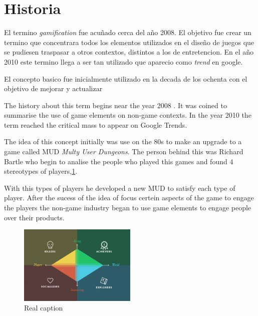 \section{Historia}

El termino \emph{gamification} fue acuñado cerca del año 2008\cite{DefineGamefication}.
El objetivo fue crear un termino que concentrara todos los elementos utilizados en el 
diseño de juegos que se pudiesen traspasar a otros contextos, distintos a los de entretencion.
En el año 2010 este termino llega a ser tan utilizado que aparecio como \emph{trend}
en google\cite{LiCap1.3}.

El concepto basico fue inicialmente utilizado en la decada de los ochenta con el objetivo
de mejorar y actualizar



The history about this term begins near the year 2008 \cite{DefineGamefication}. 
It was coined to summarise the use of game elements on non-game contexts.
In the year 2010 the term reached the critical mass to appear on Google
Trends\cite{LiCap1.3}.

The idea of this concept initially was use on the 80s to make an upgrade to a 
game called MUD \emph{Multy User Dungeons}. The person behind this was Richard Bartle
who begin to analise the people who played this games and found 4 stereotypes of
players,\ref{fig:Players}.

With this types of players he developed a new MUD to satisfy each type of player.
After the sucess of the idea of focus certein aspects of the game to engage the players
the non-game industry began to use game elements to engage people over their products. 

\begin{figure}[!htb]
  \centering
  \includegraphics[width=0.5\textwidth]{images/TypeOfPlayersBartle.png}
  \caption[Caption for LOF]{Real caption\footnotemark}
  \label{fig:Players}
\end{figure}

 	
